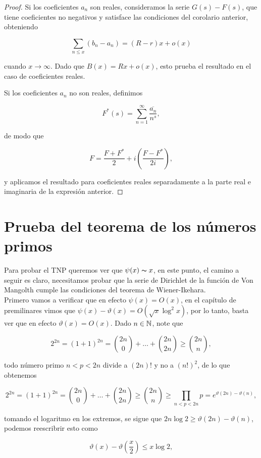 \begin{proof}
Si los coeficientes $a_n$ son reales, consideramos la serie $G(s)-F(s)$, que tiene coeficientes no negativos y satisface las condiciones del corolario anterior, obteniendo

$$
\sum_{n \leq x}\left(b_n-a_n\right) = (R-r) x + o(x)
$$

cuando $x \to \infty$. Dado que $B(x) = R x + o(x)$, esto prueba el resultado en el caso de coeficientes reales.  

Si los coeficientes $a_n$ no son reales, definimos

$$
F^*(s) = \sum_{n=1}^{\infty} \frac{\overline{a_n}}{n^s},
$$

de modo que

$$
F = \frac{F + F^*}{2} + i\left(\frac{F - F^*}{2 i}\right),
$$

y aplicamos el resultado para coeficientes reales separadamente a la parte real e imaginaria de la expresión anterior.
\end{proof}


\section{Prueba del teorema de los números primos}

Para probar el TNP queremos ver que $\psi(x)\thicksim x$, en este punto, el camino a seguir es claro, necesitamos probar que la serie de Dirichlet de la función de Von Mangolth cumple las condiciones del teorema de Wiener-Ikehara.\\

Primero vamos a verificar que en efecto $\psi(x)=O(x)$, en el capítulo de premilinares vimos que $\psi(x)-\vartheta(x)=O(\sqrt{x}\log^2 x)$, por lo tanto, basta ver que en efecto $\vartheta(x)=O(x)$. Dado $n\in \mathbb{N}$, note que

$$2^{2n}=(1+1)^{2n}=\binom{2n}{0}+\ldots+\binom{2n}{2n}\geq \binom{2n}{n},$$

todo número primo $n<p<2n$ divide a $(2n)!$ y no a $(n!)^2$, de lo que obtenemos

$$2^{2n}=(1+1)^{2n}=\binom{2n}{0}+\ldots+\binom{2n}{2n}\geq \binom{2n}{n}\geq \prod_{n<p<2n}p=e^{\displaystyle\vartheta(2n)-\vartheta(n)},$$

tomando el logaritmo en los extremos, se sigue que $2n\log 2\geq \vartheta(2n)-\vartheta(n)$, podemos reescribrir esto como

$$\vartheta(x)-\vartheta\left(\frac{x}{2}\right)\leq x\log 2,
$$

